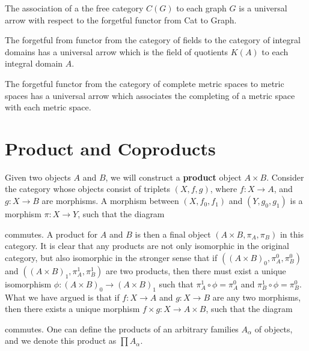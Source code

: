 \begin{example}
    The association of a the free category $C(G)$ to each graph $G$ is a universal arrow with respect to the forgetful functor from {\sf Cat} to {\sf Graph}.
\end{example}

\begin{example}
    The forgetful from functor from the category of fields to the category of integral domains has a universal arrow which is the field of quotients $K(A)$ to each integral domain $A$.
\end{example}

\begin{example}
    The forgetful functor from the category of complete metric spaces to metric spaces has a universal arrow which associates the completing of a metric space with each metric space.
\end{example}

\section{Product and Coproducts}

Given two objects $A$ and $B$, we will construct a {\bf product} object $A \times B$. Consider the category whose objects consist of triplets $(X,f,g)$, where $f: X \to A$, and $g: X \to B$ are morphisms. A morphism between $(X,f_0,f_1)$ and $(Y,g_0,g_1)$ is a morphism $\pi: X \to Y$, such that the diagram
%
\begin{center}
\end{center}
%
commutes. A product for $A$ and $B$ is then a final object $(A \times B, \pi_A, \pi_B)$ in this category. It is clear that any products are not only isomorphic in the original category, but also isomorphic in the stronger sense that if $((A \times B)_0, \pi_A^0, \pi_B^0)$ and $((A \times B)_1, \pi_A^1, \pi_B^1)$ are two products, then there must exist a unique isomorphism $\phi: (A \times B)_0 \to (A \times B)_1$ such that $\pi^1_A \circ \phi = \pi^0_A$ and $\pi^1_B \circ \phi = \pi^0_B$. What we have argued is that if $f: X \to A$ and $g: X \to B$ are any two morphisms, then there exists a unique morphism $f \times g: X \to A \times B$, such that the diagram
%
\begin{center}
\end{center}
%
commutes. One can define the products of an arbitrary families $A_\alpha$ of objects, and we denote this product as $\prod A_\alpha$.

